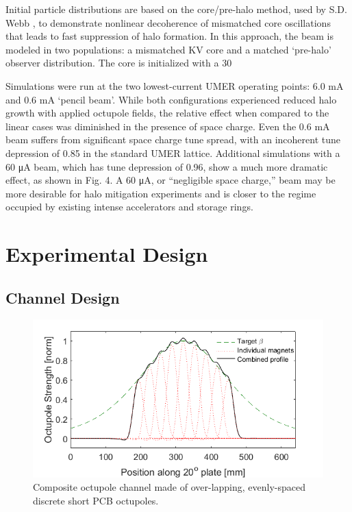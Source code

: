 Initial particle distributions are based on the core/pre-halo method, used by S.D. Webb \cite{Webb2013},\cite{WebbIPAC2013} to demonstrate nonlinear decoherence of mismatched core oscillations that leads to fast suppression of halo formation. In this approach, the beam is modeled in two populations: a mismatched KV core and a matched ‘pre-halo’ observer distribution. The core is initialized with a 30%

Simulations were run at the two lowest-current UMER operating points: 6.0 mA and 0.6 mA ‘pencil beam’. While both configurations experienced reduced halo growth with applied octupole fields, the relative effect when compared to the linear cases was diminished in the presence of space charge. Even the 0.6 mA beam suffers from significant space charge tune spread, with an incoherent tune depression of 0.85 in the standard UMER lattice. Additional simulations with a 60 μA beam, which has tune depression of 0.96, show a much more dramatic effect, as shown in Fig. 4. A 60 μA, or “negligible space charge,” beam may be more desirable for halo mitigation experiments and is closer to the regime occupied by existing intense accelerators and storage rings. 





 

  
 \section{Experimental Design}
 \subsection{Channel Design}
 
\begin{figure}[]
\centering
\includegraphics[width=\textwidth]{7.figures/long_channel_N9_cleanedup.png}   
\caption{Composite octupole channel made of over-lapping, evenly-spaced discrete short PCB octupoles.}
\label{fig:octchannel}
\end{figure}  



